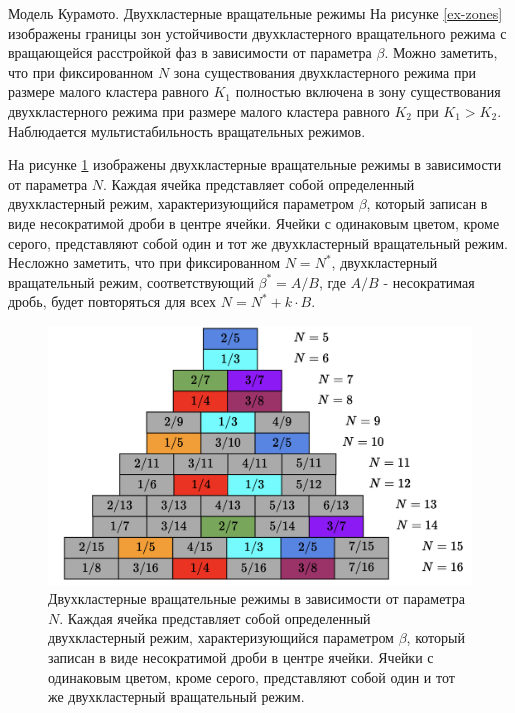 \begin{chapter}{Модель Курамото. Двухкластерные вращательные режимы}
	На рисунке \ref{ex-zones} изображены границы зон устойчивости двухкластерного вращательного режима
	с вращающейся расстройкой фаз в зависимости от параметра $\beta$.
	Можно заметить, что при фиксированном $N$ зона существования двухкластерного режима при размере малого кластера равного $K_1$ полностью включена в 
	зону существования двухкластерного режима при размере малого кластера равного $K_2$ при $K_1 > K_2$. Наблюдается мультистабильность вращательных режимов.


	На рисунке \ref{schema} изображены двухкластерные вращательные режимы в зависимости от параметра $N$.
	Каждая ячейка представляет собой определенный двухкластерный режим,
	характеризующийся параметром $\beta$, который записан в виде несократимой дроби в центре ячейки. Ячейки с одинаковым цветом, кроме серого, представляют собой
	один и тот же двухкластерный вращательный режим. Несложно заметить, что при фиксированном $N = N^*$,
	двухкластерный вращательный режим, соответствующий $\beta^* = A/B$, где $A/B$ - несократимая дробь, 
	будет повторяться для всех $N = N^* + k\cdot B$. 

	\begin{figure}[h!]
		\begin{center}
			\includegraphics[width=1\columnwidth]{pictures/schema.png}
		\end{center}
		\caption{Двухкластерные вращательные режимы в зависимости от параметра $N$. Каждая ячейка представляет собой определенный двухкластерный режим,
		характеризующийся параметром $\beta$, который записан в виде несократимой дроби в центре ячейки. Ячейки с одинаковым цветом, кроме серого, представляют собой
		один и тот же двухкластерный вращательный режим.}
		\label{schema}
	\end{figure}

\end{chapter}